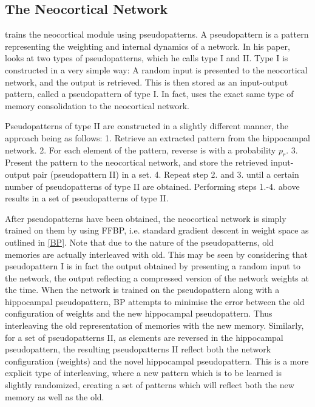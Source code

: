 \subsection{The Neocortical Network}

\cite{Hattori2010} trains the neocortical module using pseudopatterns. A pseudopattern is a pattern representing the weighting and internal dynamics of a network. In his paper, \cite{Hattori2010} looks at two types of pseudopatterns, which he calls type I and II. Type I is constructed in a very simple way: A random input is presented to the neocortical network, and the output is retrieved. This is then stored as an input-output pattern, called a pseudopattern of type I. In fact, \cite{Hattori2014} uses the exact same type of memory consolidation to the neocortical network.

Pseudopatterns of type II are constructed in a slightly different manner, the approach being as follows:
1. Retrieve an extracted pattern from the hippocampal network.
2. For each element of the pattern, reverse is with a probability $p_r$.
3. Present the pattern to the neocortical network, and store the retrieved input-output pair (pseudopattern II) in a set.
4. Repeat step 2. and 3. until a certain number of pseudopatterns of type II are obtained.
Performing steps 1.-4. above results in a set of pseudopatterns of type II.

After pseudopatterns have been obtained, the neocortical network is simply trained on them by using FFBP, i.e. standard gradient descent in weight space as outlined in \ref{BP}. Note that due to the nature of the pseudopatterns, old memories are actually interleaved with old. This may be seen by considering that pseudopattern I is in fact the output obtained by presenting a random input to the network, the output reflecting a compressed version of the network weights at the time. When the network is trained on the pseudopattern along with a hippocampal pseudopattern, BP attempts to minimise the error between the old configuration of weights and the new hippocampal pseudopattern. Thus interleaving the old representation of memories with the new memory.
Similarly, for a set of pseudopatterns II, as elements are reversed in the hippocampal pseudopattern, the resulting pseudopatterns II reflect both the network configuration (weights) and the novel hippocampal pseudopattern. This is a more explicit type of interleaving, where a new pattern which is to be learned is slightly randomized, creating a set of patterns which will reflect both the new memory as well as the old.

